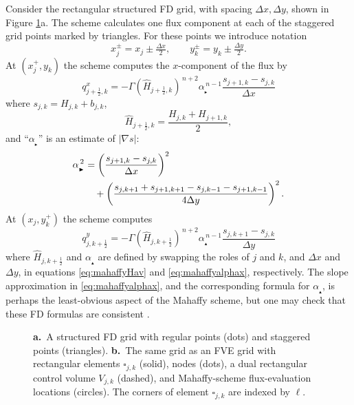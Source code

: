 \documentclass[twocolumn,letterpaper]{igs}
\newcommand{\grad}{\nabla}
\newcommand\alpharight{\alpha_{{}_{\blacktriangleright}}}
\newcommand\alphaup{\alpha_{{\!}_{\blacktriangle}}}
\newcommand{\dxtwo}{\tfrac{\Delta x}{2}}
\newcommand{\dytwo}{\tfrac{\Delta y}{2}}
\newcommand{\half}{\tfrac{1}{2}}
\begin{document}
Consider the rectangular structured FD grid, with spacing $\Delta x,\Delta y$, shown in Figure \ref{fig:fdfemgrids}a.  The \cite{Mahaffy1976} scheme calculates one flux component at each of the staggered grid points marked by triangles.  For these points we introduce notation
\begin{equation}
x_j^\pm = x_j \pm \dxtwo, \qquad y_k^\pm = y_k \pm \dytwo. \label{eq:definexypm}
\end{equation}
At $(x_j^+,y_k)$ the scheme computes the $x$-component of the flux by
\begin{equation}
q^x_{j+\half,k} = - \Gamma (\hat H_{j+\half,k})^{\,n+2} \alpharight^{\,n-1} \frac{s_{j+1,k} - s_{j,k}}{\Delta x}  \label{eq:mahaffyqx}
\end{equation}
where $s_{j,k} = H_{j,k} + b_{j,k}$,
\begin{equation}
  \hat H_{j+\half,k} = \frac{H_{j,k} + H_{j+1,k}}{2},  \label{eq:mahaffyHav}
\end{equation}
and ``$\alpharight$\!'' is an estimate of $|\grad s|$:
\begin{align}
\alpharight^{\,2} &= \left(\frac{s_{j+1,k} - s_{j,k}}{\Delta x}\right)^2  \label{eq:mahaffyalphax} \\
  &\quad + \left(\frac{s_{j,k+1} + s_{j+1,k+1} - s_{j,k-1} - s_{j+1,k-1}}{4 \Delta y}\right)^2. \notag
\end{align}
At $(x_j,y_k^+)$ the scheme computes
\begin{equation}
q^y_{j,k+\half} = - \Gamma (\hat H_{j,k+\half})^{\,n+2} \alphaup^{\,n-1} \frac{s_{j,k+1} - s_{j,k}}{\Delta y}  \label{eq:mahaffyqy}
\end{equation}
where $\hat H_{j,k+\half}$ and $\alphaup$ are defined by swapping the roles of $j$ and $k$, and $\Delta x$ and $\Delta y$, in equations \eqref{eq:mahaffyHav} and \eqref{eq:mahaffyalphax}, respectively.  The slope approximation in \eqref{eq:mahaffyalphax}, and the corresponding formula for $\alphaup$, is perhaps the least-obvious aspect of the Mahaffy scheme, but one may check that these FD formulas are consistent \citep{MortonMayers2005}.

\begin{figure}[ht]
\begin{center}
 \quad 
\end{center}
\caption{\textbf{a.}~A structured FD grid with regular points (dots) and staggered points (triangles).  \textbf{b.}~The same grid as an FVE grid with rectangular elements $\square_{j,k}$ (solid), nodes (dots), a dual rectangular control volume $V_{j,k}$ (dashed), and Mahaffy-scheme flux-evaluation locations (circles).  The corners of element $\square_{j,k}$ are indexed by $\ell$.}
\label{fig:fdfemgrids}
\end{figure}
\end{document}
